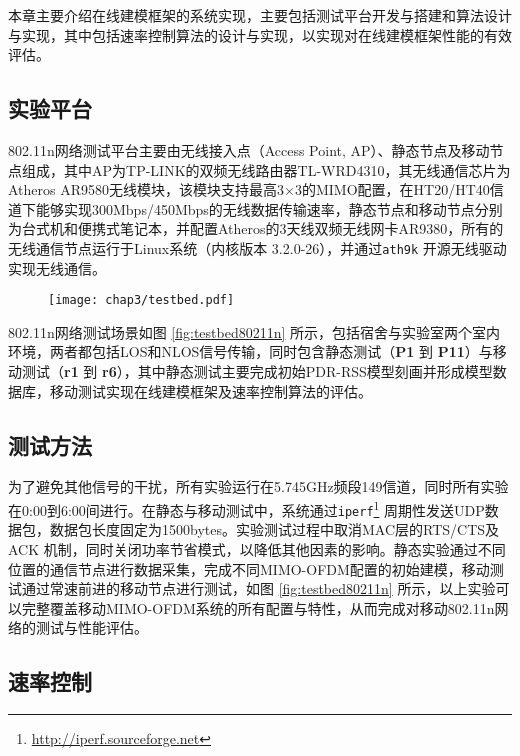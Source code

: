 本章主要介绍在线建模框架的系统实现，主要包括测试平台开发与搭建和算法设计与实现，其中包括速率控制算法的设计与实现，以实现对在线建模框架性能的有效评估。

\subsection{实验平台}
\label{sec:platform80211n}

802.11n网络测试平台主要由无线接入点（Access Point, AP）、静态节点及移动节点组成，其中AP为TP-LINK的双频无线路由器TL-WRD4310，其无线通信芯片为Atheros AR9580无线模块，该模块支持最高3$\times$3的MIMO配置，在HT20/HT40信道下能够实现300Mbps/450Mbps的无线数据传输速率，静态节点和移动节点分别为台式机和便携式笔记本，并配置Atheros的3天线双频无线网卡AR9380，所有的无线通信节点运行于Linux系统（内核版本 3.2.0-26），并通过\texttt{ath9k} \cite{ath9k}开源无线驱动实现无线通信。

\begin{figure}[!htp]
\centering
\texttt{[image: chap3/testbed.pdf]}
\end{figure}

802.11n网络测试场景如图 \ref{fig:testbed80211n} 所示，包括宿舍与实验室两个室内环境，两者都包括LOS和NLOS信号传输，同时包含静态测试（\textbf{P1} 到 \textbf{P11}）与移动测试（\textbf{r1} 到 \textbf{r6}），其中静态测试主要完成初始PDR-RSS模型刻画并形成模型数据库，移动测试实现在线建模框架及速率控制算法的评估。

\subsection{测试方法}
\label{sec:measurement80211n}

为了避免其他信号的干扰，所有实验运行在5.745GHz频段149信道，同时所有实验在0:00到6:00间进行。在静态与移动测试中，系统通过\texttt{iperf}\footnote{\url{http://iperf.sourceforge.net}} 周期性发送UDP数据包，数据包长度固定为1500bytes。实验测试过程中取消MAC层的RTS/CTS及ACK 机制，同时关闭功率节省模式，以降低其他因素的影响。静态实验通过不同位置的通信节点进行数据采集，完成不同MIMO-OFDM配置的初始建模，移动测试通过常速前进的移动节点进行测试，如图 \ref{fig:testbed80211n} 所示，以上实验可以完整覆盖移动MIMO-OFDM系统的所有配置与特性，从而完成对移动802.11n网络的测试与性能评估。

\subsection{速率控制}
\label{sec:adaption80211n}

